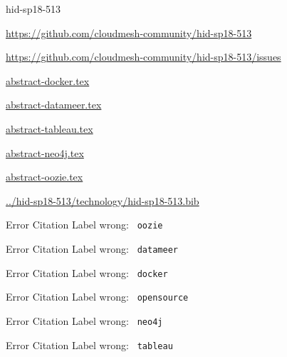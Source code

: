 \begin{IU}

hid-sp18-513

\url{https://github.com/cloudmesh-community/hid-sp18-513}

\url{https://github.com/cloudmesh-community/hid-sp18-513/issues}

\href{https://github.com/cloudmesh-community/hid-sp18-513/blob/master//technology/abstract-docker.tex}{abstract-docker.tex}

\href{https://github.com/cloudmesh-community/hid-sp18-513/blob/master//technology/abstract-datameer.tex}{abstract-datameer.tex}

\href{https://github.com/cloudmesh-community/hid-sp18-513/blob/master//technology/abstract-tableau.tex}{abstract-tableau.tex}

\href{https://github.com/cloudmesh-community/hid-sp18-513/blob/master//technology/abstract-neo4j.tex}{abstract-neo4j.tex}

\href{https://github.com/cloudmesh-community/hid-sp18-513/blob/master//technology/abstract-oozie.tex}{abstract-oozie.tex}

\href{https://github.com/cloudmesh-community/hid-sp18-513/blob/master//technology/hid-sp18-513.bib}{../hid-sp18-513/technology/hid-sp18-513.bib}

 Error Citation Label wrong: \verb| oozie |

 Error Citation Label wrong: \verb| datameer |

 Error Citation Label wrong: \verb| docker |

 Error Citation Label wrong: \verb| opensource |

 Error Citation Label wrong: \verb| neo4j |

 Error Citation Label wrong: \verb| tableau |

\end{IU}


